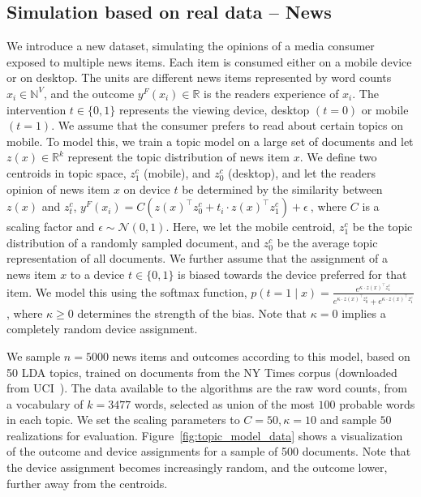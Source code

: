\subsection{Simulation based on real data -- News }
We introduce a new dataset, simulating the opinions of a media consumer exposed to multiple news items. Each item is consumed either on a mobile device or on desktop. The units are different news items represented by word counts $x_i \in \mathbb{N}^V$, and the outcome $y^F(x_i) \in \mathbb{R}$ is the readers experience of $x_i$. The intervention $t \in \{0, 1\}$ represents the viewing device, desktop $(t=0)$ or mobile $(t=1)$.
We assume that the consumer prefers to read about certain topics on mobile. To model this, we train a topic model on a large set of documents and let $z(x) \in \mathbb{R}^k$ represent the topic distribution of news item $x$. We define two centroids in topic space, $z^c_1$ (mobile), and $z^c_0$ (desktop), and let the readers opinion of news item $x$ on device $t$ be determined by the similarity between $z(x)$ and $z^c_t$,
$
y^F(x_i) = C \left(z(x)^\top z^c_0 + t_i\cdot z(x)^\top z^c_1\right) + \epsilon ~
$,
where $C$ is a scaling factor and $\epsilon \sim \mathcal{N}(0,1)$. Here, we let the mobile centroid, $z^c_1$ be the topic distribution of a randomly sampled document, and $z^c_0$ be the average topic representation of all documents. We further assume that the assignment of a news item $x$ to a device $t \in \{0,1\}$ is biased towards the device preferred for that item. We model this using the softmax function,
$
p(t = 1 \mid x) = \frac{e^{\kappa\cdot z(x)^\top z^c_1}}{e^{\kappa\cdot z(x)^\top z^c_0} + e^{\kappa\cdot z(x)^\top z^c_1}}
$,
where $\kappa \geq 0$ determines the strength of the bias. Note that $\kappa = 0$ implies a completely random device assignment.

We sample $n=5000$ news items and outcomes according to this model, based on 50 LDA topics, trained on documents from the NY Times corpus (downloaded from UCI~\cite{bagofwords}). The data available to the algorithms are the raw word counts, from a vocabulary of $k=3477$ words, selected as union of the most $100$ probable words in each topic. We set the scaling parameters to $C=50, \kappa=10$ and sample $50$ realizations for evaluation. Figure~\ref{fig:topic_model_data} shows a visualization of the outcome and device assignments for a  sample of 500 documents. Note that the device assignment becomes increasingly random, and the outcome lower, further away from the centroids.

